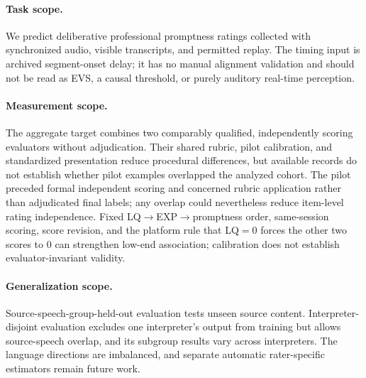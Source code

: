 \paragraph{Task scope.} We predict deliberative professional promptness ratings collected with synchronized audio, visible transcripts, and permitted replay. The timing input is archived segment-onset delay; it has no manual alignment validation and should not be read as EVS, a causal threshold, or purely auditory real-time perception.

\paragraph{Measurement scope.} The aggregate target combines two comparably qualified, independently scoring evaluators without adjudication. Their shared rubric, pilot calibration, and standardized presentation reduce procedural differences, but available records do not establish whether pilot examples overlapped the analyzed cohort. The pilot preceded formal independent scoring and concerned rubric application rather than adjudicated final labels; any overlap could nevertheless reduce item-level rating independence. Fixed LQ$\rightarrow$EXP$\rightarrow$promptness order, same-session scoring, score revision, and the platform rule that LQ$=0$ forces the other two scores to 0 can strengthen low-end association; calibration does not establish evaluator-invariant validity.

\paragraph{Generalization scope.} Source-speech-group-held-out evaluation tests unseen source content. Interpreter-disjoint evaluation excludes one interpreter's output from training but allows source-speech overlap, and its subgroup results vary across interpreters. The language directions are imbalanced, and separate automatic rater-specific estimators remain future work.
